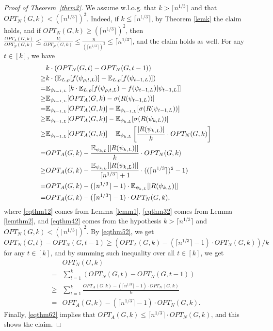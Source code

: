 \begin{proof}[Proof of Theorem~\ref{thrm2}]
We assume w.l.o.g. that $k>\lceil n^{1/3}\rceil $ and that $OPT_N(G,k)<(\lceil n^{1/3}\rceil)^2$. Indeed, if $k\leq  \lceil n^{1/3}\rceil $, by Theorem \ref{lemk} the claim holds, and if $OPT_N(G,k)\geq (\lceil n^{1/3}\rceil)^2$, then $\frac{OPT_A(G,k)}{OPT_N(G,k)}\leq \frac{|V|}{OPT_N(G,k)}\leq \frac{n}{(\lceil n^{1/3}\rceil)^2}\leq \lceil n^{1/3}\rceil $, and the claim holds as well. 
For any $t\in [k]$, we have
\begin{align}
&k\cdot (OPT_N(G,t)-OPT_N(G,t-1))\nonumber\\
\geq &k\cdot (\mathbb{E}_{L,\rho}[f({\psi}_{\rho,t,L})]-\mathbb{E}_{L,\rho}[f(\psi_{t-1,L})])\nonumber\\
=& \mathbb{E}_{\psi_{t-1,L}}\left[k\cdot \mathbb{E}_{L,\rho}[f({\psi}_{\rho,t,L})-f(\psi_{t-1,L})|\psi_{t-1,L}]\right]\nonumber\\
\geq &\mathbb{E}_{\psi_{t-1,L}}[OPT_A(G,k)-\sigma(R(\psi_{t-1,L}))]\label{eqthm12}\\
=&\mathbb{E}_{\psi_{t-1,L}}[OPT_A(G,k)]-\mathbb{E}_{\psi_{t-1,L}}[\sigma(R(\psi_{t-1,L}))]\nonumber\\
\geq &\mathbb{E}_{\psi_{t-1,L}}[OPT_A(G,k)]-\mathbb{E}_{\psi_{k,L}}[\sigma(R(\psi_{k,L}))]\nonumber\\
\geq &\mathbb{E}_{\psi_{t-1,L}}[OPT_A(G,k)]-\mathbb{E}_{\psi_{k,L}}\left[\frac{|R(\psi_{k,L})|}{k}\cdot OPT_N(G,k)\right]\label{eqthm32}\\
= &OPT_A(G,k)-\frac{\mathbb{E}_{\psi_{k,L}}[|R(\psi_{k,L})|]}{k}\cdot OPT_N(G,k)\nonumber\\
\geq  &OPT_A(G,k)-\frac{\mathbb{E}_{\psi_{k,L}}[|R(\psi_{k,L})|]}{\lceil n^{1/3}\rceil+1}\cdot ((\lceil n^{1/3}\rceil)^2-1)\label{eqthm42}\\
=&OPT_A(G,k)-(\lceil n^{1/3}\rceil-1)\cdot \mathbb{E}_{\psi_{k,L}}[|R(\psi_{k,L})|]\nonumber\\
=&OPT_A(G,k)-(\lceil n^{1/3}\rceil-1)\cdot OPT_N(G,k)\label{eqthm52},
\end{align}
where \eqref{eqthm12} comes from Lemma \ref{lemm1}, \eqref{eqthm32} comes from Lemma \ref{lemthm2}, and \eqref{eqthm42} comes from the hypothesis $k>\lceil n^{1/3}\rceil $ and $OPT_N(G,k)<(\lceil n^{1/3}\rceil)^2$. By \eqref{eqthm52}, we get $OPT_N(G,t)-OPT_N(G,t-1)
\geq (OPT_A(G,k)-(\lceil n^{1/3}\rceil-1)\cdot OPT_N(G,k))/k$ for any $t\in [k]$, and by summing such inequality over all $t\in [k]$, we get
\begin{align}
& OPT_N(G,k)\nonumber\\
=&\sum_{t=1}^k (OPT_N(G,t)-OPT_N(G,t-1))\nonumber\\
\geq &\sum_{t=1}^k\frac{OPT_A(G,k)-(\lceil n^{1/3}\rceil-1)\cdot OPT_N(G,k)}{k}\nonumber\\
=&OPT_A(G,k)-(\lceil n^{1/3}\rceil-1)\cdot OPT_N(G,k).\label{eqthm62}
\end{align}
Finally, \eqref{eqthm62} implies that $OPT_A(G,k)\leq \lceil n^{1/3}\rceil \cdot OPT_N(G,k)$, and this shows the claim. 
\end{proof}
